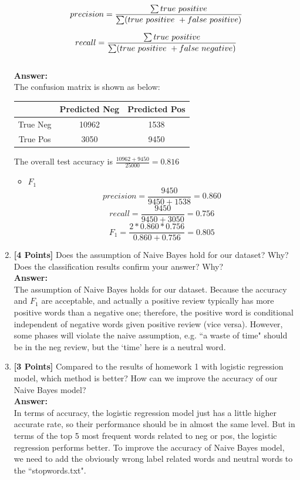 \documentclass{article}
\begin{document}
\begin{enumerate}
	\begin{equation}\label{eqn:precision}
	\ precision =  {\sum true\ positive\over \sum (true\ positive\ +  false\ positive)}
	\end{equation}
	
	\begin{equation}\label{eqn:recall}
	\ recall =  {\sum true\ positive\over \sum (true\ positive\ +  false\ negative)}
	\end{equation}\\
	\textbf{Answer:}\\
	The confusion matrix is shown as below:
	\begin{table}[!h]
		\centering
		\begin{tabular}{|c|c|c|}
			\hline
			  & Predicted Neg & Predicted Pos \\
			  \hline
		True Neg & 10962	& 1538 \\
		\hline
		True Pos & 3050		& 9450  \\
		\hline
		\end{tabular}
	\end{table}

	The overall test accuracy is $\frac{10962+9450}{25000}=0.816$
	
	\begin{itemize}
		\item $F_1$
		$$precision = \frac{9450}{9450+1538} = 0.860$$
		$$recall = \frac{9450}{9450+3050} = 0.756$$
		$$F_1 = \frac{2*0.860*0.756}{0.860+0.756}=0.805$$
	\end{itemize}
		
	
	\item \textbf{[4 Points]} Does the assumption of Naive Bayes hold for our dataset? Why? Does the classification results confirm your answer? Why?\\
	\textbf{Answer:}\\
	The assumption of Naive Bayes holds for our dataset. Because the accuracy and $F_1$ are acceptable, and actually a positive review typically has more positive words than a negative one; therefore, the positive word is conditional independent of negative words given positive review (vice versa). However, some phases will violate the naive assumption, e.g. ``a waste of time" should be in the neg review, but the `time' here is a neutral word.
	
	
	\item \textbf{[3 Points]} Compared to the results of homework 1 with logistic regression model, which method is better? How can we improve the accuracy of our Naive Bayes model?\\
	\textbf{Answer:}\\
	In terms of accuracy, the logistic regression model just has a little higher accurate rate, so their performance should be in almost the same level. But in terms of the top 5 most frequent words related to neg or pos, the logistic regression performs better. To improve the accuracy of Naive Bayes model, we need to add the obviously wrong label related words and neutral words to the ``stopwords.txt".
	
\end{enumerate}
\end{document}
